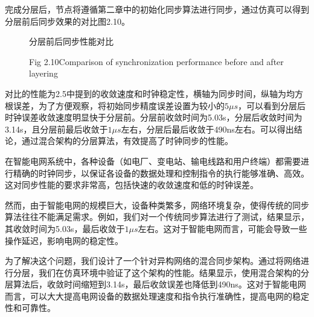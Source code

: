 \documentclass[UTF8,a4paper,12pt]{ctexart}
\numberwithin{equation}{section}
\begin{document}
	完成分层后，节点将遵循第二章中的初始化同步算法进行同步，通过仿真可以得到分层前后同步效果的对比图2.10。
	\begin{figure}[H] 
		\caption{分层前后同步性能对比}
		\vspace{-10pt}
		\caption*{Fig 2.10\quad Comparison of synchronization performance before and after layering}
	\end{figure}
	
	对比的性能为2.5中提到的收敛速度和时钟稳定性，横轴为同步时间，纵轴为均方根误差，为了方便观察，将初始同步精度误差设置为较小的$5\mu s$，可以看到分层后时钟误差收敛速度明显快于分层前。分层前收敛时间为5.03s，分层后收敛时间为3.14s，且分层前最后收敛于$1\mu s$左右，分层后最后收敛于490ns左右。可以得出结论，通过混合架构的分层算法，有效提高了时钟同步的性能。
	
	在智能电网系统中，各种设备（如电厂、变电站、输电线路和用户终端）都需要进行精确的时钟同步，以保证各设备的数据处理和控制指令的执行能够准确、高效。这对同步性能的要求非常高，包括快速的收敛速度和低的时钟误差。
	
	然而，由于智能电网的规模巨大，设备种类繁多，网络环境复杂，使得传统的同步算法往往不能满足需求。例如，我们对一个传统同步算法进行了测试，结果显示，其收敛时间为5.03s，最后收敛于$1\mu s$左右。这对于智能电网而言，可能会导致一些操作延迟，影响电网的稳定性。
	
	为了解决这个问题，我们设计了一个针对异构网络的混合同步架构。通过将网络进行分层，我们在仿真环境中验证了这个架构的性能。结果显示，使用混合架构的分层算法后，收敛时间缩短到3.14s，最后收敛误差也降低到490ns。这对于智能电网而言，可以大大提高电网设备的数据处理速度和指令执行准确性，提高电网的稳定性和可靠性。
	
\end{document}
